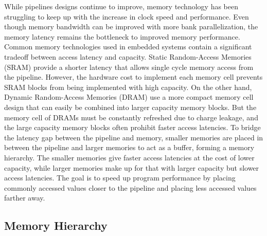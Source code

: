 While pipelines designs continue to improve, memory technology has been struggling to keep up with the increase in clock speed and performance.
Even though memory bandwidth can be improved with more bank parallelization, the memory latency remains the bottleneck to improved memory performance.
Common memory technologies used in embedded systems contain a significant tradeoff between access latency and capacity. 
Static Random-Access Memories (SRAM) provide a shorter latency that allows single cycle memory access from the pipeline.
However, the hardware cost to implement each memory cell prevents SRAM blocks from being implemented with high capacity.
On the other hand, Dynamic Random-Access Memories (DRAM) use a more compact memory cell design that can easily be combined into larger capacity memory blocks.
But the memory cell of DRAMs must be constantly refreshed due to charge leakage, and the large capacity memory blocks often prohibit faster access latencies.
To bridge the latency gap between the pipeline and memory, smaller memories are placed in between the pipeline and larger memories to act as a buffer, forming a memory hierarchy.
The smaller memories give faster access latencies at the cost of lower capacity, while larger memories make up for that with larger capacity but slower access latencies. 
The goal is to speed up program performance by placing commonly accessed values closer to the pipeline and placing less accessed values farther away.

\subsection{Memory Hierarchy}
